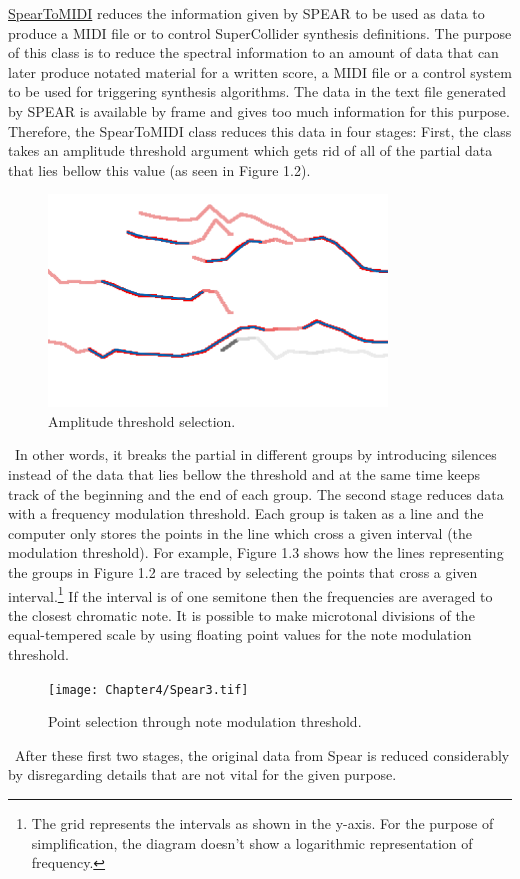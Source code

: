 \href{http://github.com/freuben/FedeLib/blob/master/SpearToSC/SpearToMIDI.sc}{SpearToMIDI} reduces the information given by SPEAR to be used as data to produce a MIDI file or to control SuperCollider synthesis definitions. The purpose of this class is to reduce the spectral information to an amount of data that can later produce notated material for a written score, a MIDI file or a control system to be used for triggering synthesis algorithms. The data in the text file generated by SPEAR is available by frame and gives too much information for this purpose. Therefore, the SpearToMIDI class reduces this data in four stages: First, the class takes an amplitude threshold argument which gets rid of all of the partial data that lies bellow this value (as seen in Figure 1.2).
\begin{figure}[htbp] %
   \centering
   \includegraphics[width=9cm]{Chapter4/Spear2.tif} %
   \caption{Amplitude threshold selection.}
   \label{fig:example}
\end{figure}\
In other words, it breaks the partial in different groups by introducing silences instead of the data that lies bellow the threshold and at the same time keeps track of the beginning and the end of each group. The second stage reduces data with a frequency modulation threshold. Each group is taken as a line and the computer only stores the points in the line which cross a given interval (the modulation threshold). For example, Figure 1.3 shows how the lines representing the groups in Figure 1.2 are traced by selecting the points that cross a given interval.\footnote{The grid represents the intervals as shown in the y-axis. For the purpose of simplification, the diagram doesn't show a logarithmic representation of frequency.} If the interval is of one semitone then the frequencies are averaged to the closest chromatic note. It is possible to make microtonal divisions of the equal-tempered scale by using floating point values for the note modulation threshold.
\begin{figure}[htbp] %
   \centering
   \texttt{[image: Chapter4/Spear3.tif]} %
   \caption{Point selection through note modulation threshold.}
   \label{fig:example}
\end{figure}\
After these first two stages, the original data from Spear is reduced considerably by disregarding details that are not vital for the given purpose. 

